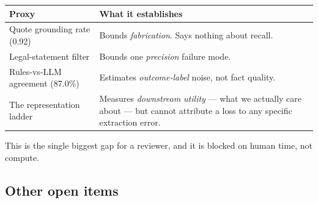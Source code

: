 \documentclass[12pt,a4paper]{article}
\begin{document}
\begin{center}
\begin{tabular}{@{}lp{9.2cm}@{}}
\toprule
\textbf{Proxy} & \textbf{What it establishes} \\
\midrule
Quote grounding rate (0.92)   & Bounds \emph{fabrication}. Says nothing about recall. \\
Legal-statement filter        & Bounds one \emph{precision} failure mode. \\
Rules-vs-LLM agreement (87.0\%) & Estimates \emph{outcome-label} noise, not fact quality. \\
The representation ladder     & Measures \emph{downstream utility} --- what we actually care about ---
                                but cannot attribute a loss to any specific extraction error. \\
\bottomrule
\end{tabular}
\end{center}

This is the single biggest gap for a reviewer, and it is blocked on human time, not compute.

\subsection{Other open items}
\end{document}

